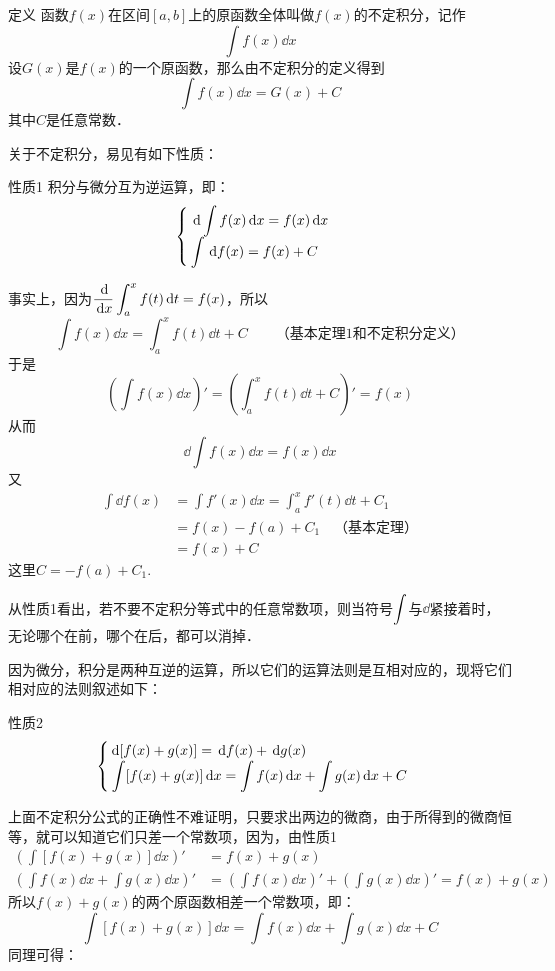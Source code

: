\begin{blk}
   {定义} 函数$f(x)$在区间$[a,b]$上的原函数全体叫做$f(x)$的不定积分，记作
   \[\int f(x)\dd x\]
   设$G(x)$是$f(x)$的一个原函数，那么由不定积分的定义得到
\[\int f (x) \dd x=G (x) +C\]
   其中$C$是任意常数．
\end{blk}   

关于不定积分，易见有如下性质：

\begin{blk}{性质1}
   积分与微分互为逆运算，即：
\[\begin{cases}
    \,{\rm d}\displaystyle\int f(x)\,{\rm d} x=f(x)\,{\rm d} x\\
    \displaystyle\int \,{\rm d} f(x)=f(x)+C
\end{cases}\]
\end{blk}

事实上，因为$\dfrac{\,{\rm d} }{\,{\rm d} x}\displaystyle\int^x_a f(t)\,{\rm d} t=f(x)$，所以
\[\int f(x)\dd x=\int^x_a f(t)\dd t+C\qquad \text{（基本定理1和不定积分定义）}\]
于是
\[\left(\int f(x)\dd x\right)'=\left(\int^x_a f(t)\dd t+C\right)'=f(x)\]
从而
\[\dd\int f(x)\dd x=f(x)\dd x\]
又
\[\begin{split}
    \int \dd f(x)&=\int f'(x)\dd x=\int^x_a f'(t)\dd t+C_1\\
    &=f(x)-f(a)+C_1\quad \text{（基本定理）}\\
    &=f(x)+C
\end{split}\]
这里$C=-f(a)+C_1$. 

从性质1看出，若不要不定积分等式中的任意常数项，则当符号$\displaystyle\int$与$\dd$紧接着时，无论哪个在前，哪个在后，都可以消掉．

因为微分，积分是两种互逆的运算，所以它们的运算法则是互相对应的，现将它们相对应的法则叙述如下：

\begin{blk}{性质2}
 \[\begin{cases}
     {\rm d} [f(x)+g(x)]=\,{\rm d} f(x)+\,{\rm d} g(x)\\
     \displaystyle\int [f(x)+g(x)] \,{\rm d} x=\displaystyle\int f(x)\,{\rm d} x+\displaystyle\int g(x)\,{\rm d} x+C
 \end{cases}\]
 \end{blk}

 上面不定积分公式的正确性不难证明，只要求出两边的微商，由于所得到的微商恒等，就可以知道它们只差一个常数项，因为，由性质1
\[\begin{split}
    \left(\int[f(x)+g(x)]\dd x\right)'&=f(x)+g(x)\\
    \left(\int f(x)\dd x+\int g(x)\dd x\right)'&=\left(\int f(x)\dd x\right)'+\left(\int g(x)\dd x\right)'=f(x)+g(x)
\end{split}\]
所以$f(x)+g(x)$的两个原函数相差一个常数项，即：
\[\int[f(x)+g(x)]\dd x=\int f(x)\dd x+\int g(x)\dd x+C\]
同理可得：

